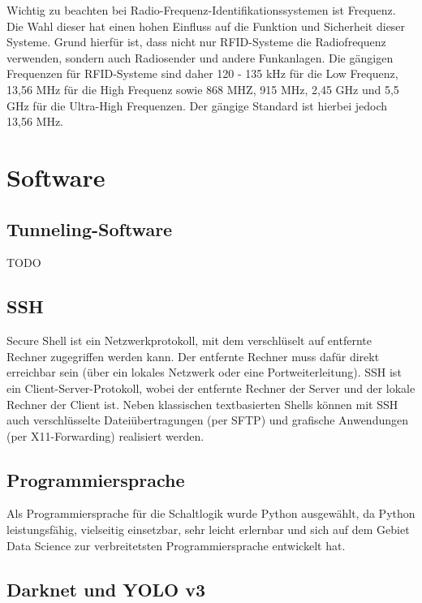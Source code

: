 Wichtig zu beachten bei Radio-Frequenz-Identifikationssystemen ist Frequenz. Die Wahl dieser hat einen hohen Einfluss auf die Funktion und Sicherheit dieser Systeme. Grund hierfür ist, dass nicht nur RFID-Systeme die Radiofrequenz verwenden, sondern auch Radiosender und andere Funkanlagen. Die gängigen Frequenzen für RFID-Systeme sind daher 120 - 135 kHz für die Low Frequenz, 13,56 MHz für die High Frequenz sowie 868 MHZ, 915 MHz, 2,45 GHz und 5,5 GHz für die Ultra-High Frequenzen. Der gängige Standard ist hierbei jedoch 13,56 MHz.\autocite[Vgl.][S. 34]{rfid}



\section{Software}

\subsection{Tunneling-Software}
TODO


\subsection{SSH}

Secure Shell ist ein Netzwerkprotokoll, mit dem verschlüselt auf entfernte Rechner zugegriffen werden kann. Der entfernte Rechner muss dafür direkt erreichbar sein (über ein lokales Netzwerk oder eine Portweiterleitung).
SSH ist ein Client-Server-Protokoll, wobei der entfernte Rechner der Server und der lokale Rechner der Client ist. Neben klassischen textbasierten Shells können mit SSH auch verschlüsselte Dateiübertragungen (per SFTP) und grafische Anwendungen (per X11-Forwarding) realisiert werden.

\subsection{Programmiersprache}
Als Programmiersprache für die Schaltlogik wurde Python ausgewählt, da Python leistungsfähig, vielseitig einsetzbar, sehr leicht erlernbar und sich auf dem Gebiet Data Science zur verbreitetsten Programmiersprache entwickelt hat.\autocite[Vgl.][S. XIV]{Raschka} 



\subsection{Darknet und YOLO v3}

